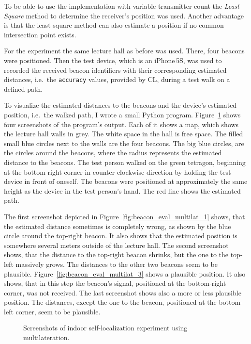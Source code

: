 To be able to use the implementation with variable transmitter count the \emph{Least Square} method to determine the receiver's position was used. Another advantage is that the least square method can also estimate a position if no common intersection point exists.

For the experiment the same lecture hall as before was used. There, four beacons were positioned. Then the test device, which is an iPhone\,5S, was used to recorded the received beacon identifiers with their corresponding estimated distances, i.e.\ the \texttt{accuracy} values, provided by \acs{CL}, during a test walk on a defined path.

To visualize the estimated distances to the beacons and the device's estimated position, i.e.\ the walked path, I wrote a small Python program. Figure~\ref{fig:beacon_eval_multilat} shows four screenshots of the program's output. Each of it shows a map, which shows the lecture hall walls in grey. The white space in the hall is free space. The filled small blue circles next to the walls are the four beacons. The big blue circles, are the circles around the beacons, where the radius represents the estimated distance to the beacons. The test person walked on the green tetragon, beginning at the bottom right corner in counter clockwise direction by holding the test device in front of oneself. The beacons were positioned at approximately the same height as the device in the test person's hand. The red line shows the estimated path.

The first screenshot depicted in Figure~\ref{fig:beacon_eval_multilat_1} shows, that the estimated distance sometimes is completely wrong, as shown by the blue circle around the top-right beacon. It also shows that the estimated position is somewhere several meters outside of the lecture hall. The second screenshot shows, that the distance to the top-right beacon shrinks, but the one to the top-left massively grows. The distances to the other two beacons seem to be plausible. Figure~\ref{fig:beacon_eval_multilat_3} shows a plausible position. It also shows, that in this step the beacon's signal, positioned at the bottom-right corner, was not received. The last screenshot shows also a more or less plausible position. The distances, except the one to the beacon, positioned at the bottom-left corner, seem to be plausible.

\begin{figure}
  
  \caption{Screenshots of indoor self-localization experiment using multilateration.}
  \label{fig:beacon_eval_multilat}
\end{figure}

